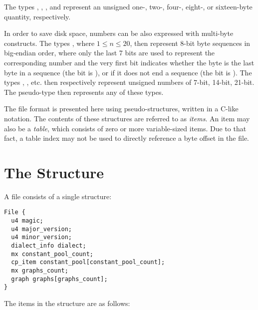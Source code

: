 The types , , ,  and  represent an unsigned one-, two-, four-, eight-, or sixteen-byte quantity, respectively. 

In order to save disk space, numbers can be also expressed with multi-byte constructs. The types , where $1 \leq n \leq 20$, then represent 8-bit byte sequences in big-endian order, where only the last 7 bits are used to represent the corresponding number and the very first bit indicates whether the byte is the last byte in a sequence (the bit is ), or if it does not end a sequence (the bit is ). The types , ,  etc. then respectively represent unsigned numbers of 7-bit, 14-bit, 21-bit. The pseudo-type  then represents any of these types. 

The  file format is presented here using pseudo-structures, written in a C-like notation. The contents of these structures are referred to as {\em items}. An item may also be a {\em table}, which consists of zero or more variable-sized items. Due to that fact, a table index may not be used to directly reference a byte offset in the file. 






\section{The  Structure}

A  file consists of a single  structure: 

\begin{lstlisting}
File {
  u4 magic;
  u4 major_version;
  u4 minor_version;
  dialect_info dialect;
  mx constant_pool_count;
  cp_item constant_pool[constant_pool_count];
  mx graphs_count;
  graph graphs[graphs_count];
}
\end{lstlisting}

The items in the  structure are as follows: 

